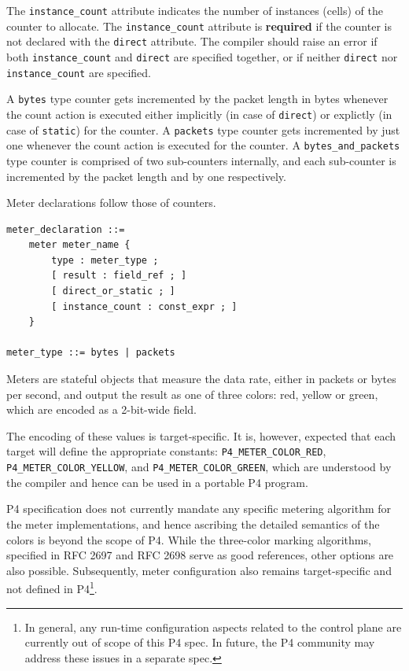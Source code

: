 \documentclass[12pt]{article}
\begin{document}
The \texttt{instance_count} attribute indicates the number of
instances (cells) of the counter to allocate. The
\texttt{instance_count} attribute is \textbf{required} if the counter
is not declared with the \texttt{direct} attribute.  The compiler
should raise an error if both \texttt{instance_count} and
\texttt{direct} are specified together, or if neither \texttt{direct}
nor \texttt{instance_count} are specified.  

A \texttt{bytes} type counter gets incremented by the packet length in bytes 
whenever the count action is executed either implicitly (in case of 
\texttt{direct}) or explictly (in case of \texttt{static}) for the counter. 
A \texttt{packets} type counter gets incremented by just one whenever 
the count action is executed for the counter. 
A \texttt{bytes_and_packets} type counter is comprised of two sub-counters 
internally, and each sub-counter is incremented by the packet length and 
by one respectively.


Meter declarations follow those of counters.

\begin{lstlisting}[style=BNFstyle]
meter_declaration ::= 
    meter meter_name {
        type : meter_type ;
        [ result : field_ref ; ]
        [ direct_or_static ; ]
        [ instance_count : const_expr ; ]
    }

meter_type ::= bytes | packets
\end{lstlisting}

Meters are stateful objects that measure the data rate, either in 
packets or bytes per second, and output the result as one of three 
colors: red, yellow or green, which are encoded as a 2-bit-wide field.

The encoding of these values is target-specific. It is, however, 
expected that each target will define the appropriate constants: 
\texttt{P4_METER_COLOR_RED}, \texttt{P4_METER_COLOR_YELLOW},
and \texttt{P4_METER_COLOR_GREEN}, which are understood by the compiler
and hence can be used in a portable P4 program.

P4 specification does not currently mandate any specific metering 
algorithm for the meter implementations, and hence ascribing the 
detailed semantics of the colors is beyond the scope of P4. While 
the three-color marking algorithms, specified in RFC 2697 and RFC 2698 
serve as good references, other options are also possible. Subsequently, 
meter configuration also remains target-specific and not defined 
in P4\footnote{In general, any run-time configuration aspects related 
to the control plane are currently out of scope of this P4 spec. In future, 
the P4 community may address these issues in a separate spec.}.
\end{document}
